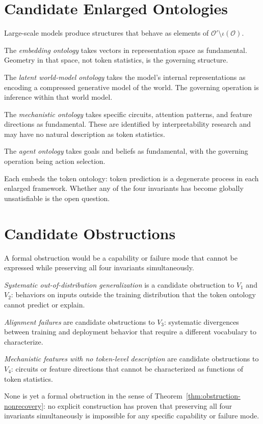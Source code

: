 \documentclass[12pt,oneside]{book}
\theoremstyle{plain}
\theoremstyle{definition}
\theoremstyle{remark}
\newcommand{\Oold}{\mathcal{O}}
\newcommand{\Onew}{\mathcal{O}'}
\begin{document}
\section{Candidate Enlarged Ontologies}

Large-scale models produce structures that behave as elements of
$\Onew \setminus \iota(\Oold)$.

The \emph{embedding ontology} takes vectors in representation space as
fundamental. Geometry in that space, not token statistics, is the governing
structure.

The \emph{latent world-model ontology} takes the model's internal
representations as encoding a compressed generative model of the world.
The governing operation is inference within that world model.

The \emph{mechanistic ontology} takes specific circuits, attention patterns,
and feature directions as fundamental. These are identified by interpretability
research and may have no natural description as token statistics.

The \emph{agent ontology} takes goals and beliefs as fundamental, with the
governing operation being action selection.

Each embeds the token ontology: token prediction is a degenerate process in
each enlarged framework. Whether any of the four invariants has become
globally unsatisfiable is the open question.

\section{Candidate Obstructions}

A formal obstruction would be a capability or failure mode that cannot be
expressed while preserving all four invariants simultaneously.

\emph{Systematic out-of-distribution generalization} is a candidate
obstruction to $V_1$ and $V_2$: behaviors on inputs outside the training
distribution that the token ontology cannot predict or explain.

\emph{Alignment failures} are candidate obstructions to $V_3$: systematic
divergences between training and deployment behavior that require a different
vocabulary to characterize.

\emph{Mechanistic features with no token-level description} are candidate
obstructions to $V_4$: circuits or feature directions that cannot be
characterized as functions of token statistics.

None is yet a formal obstruction in the sense of
Theorem~\ref{thm:obstruction-nonrecovery}: no explicit construction has
proven that preserving all four invariants simultaneously is impossible for
any specific capability or failure mode.
\end{document}

